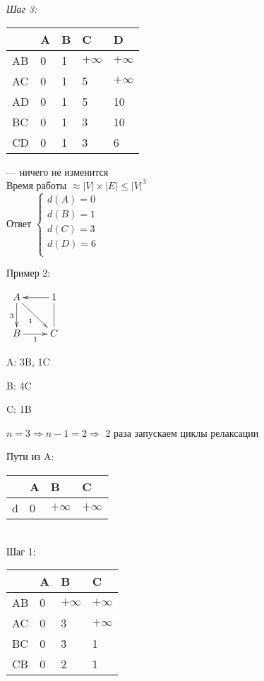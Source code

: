 \documentclass[a4paper, 12pt] {article}
\begin{document}
\textit{Шаг 3:}

\begin{tabular}{ | l | l | l |  l | l | }
	\hline
	& A & B & C  & D \\ \hline
	AB & 0 & 1 & $ + \infty $  & $ + \infty $ \\ \hline
	AC & 0 & 1 & 5 & $ + \infty $ \\ \hline
	AD & 0 & 1 & 5 & 10 \\ \hline
	BC & 0 & 1 & 3 & 10 \\ \hline
	CD & 0 & 1 & 3 & 6 \\
	\hline
\end{tabular} --- ничего не изменится\\

Время работы $ \approx |V| \times |E| \le |V|^{3} $\\

Ответ
$ \left\{
\begin{array}{ccc}
	d(A)=0 \\
	d(B)=1 \\
	d(C)=3 \\
	d(D)=6 \\
\end{array}
\right. $

\newpage
Пример 2:

$ \begin{matrix}
	\xymatrix{
		A \ar@{->}[rd]_1  \ar@{->}[d]_3 & 1 \ar@{->}[l]  \\
		B \ar@{->}[r]_{1}   & C \ar@{-}[u]   \\
	}
\end{matrix} $

A: 3B, 1C

B: 4C

C: 1B 

$ n = 3 \Rightarrow n - 1 = 2 \Rightarrow  $ 2 раза запускаем циклы  релаксации

Пути из A:

\begin{tabular}{ | l | l | l |  l | }
	\hline
	& A & B & C   \\ \hline
	d & 0 & $ + \infty $ & $ + \infty $  \\ \hline
	
\end{tabular}\\

Шаг 1:
\begin{tabular}{ | l | l | l |  l  | }
	\hline
	& A & B & C   \\ \hline
	AB & 0 & $ + \infty $ & $ + \infty $   \\ \hline
	AC & 0 & 3 & $ + \infty $  \\ \hline
	BC & 0 & 3 & 1  \\ \hline
	CB & 0 & 2 & 1  \\
	\hline
\end{tabular}\\
\end{document}
